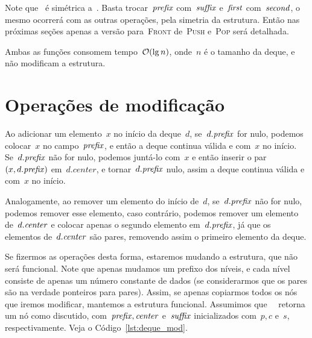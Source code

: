 \documentclass[main.tex]{subfiles}
\begin{document}
Note que~ é simétrica a~. Basta trocar~$\mathit{prefix}$ com~$\mathit{suffix}$ e~$\mathit{first}$ com~$\mathit{second}$, o mesmo ocorrerá com as outras operações, pela simetria da estrutura. Então nas próximas seções apenas a versão para~\textsc{Front} de~\textsc{Push} e~\textsc{Pop} será detalhada.

Ambas as funções consomem tempo~$\mathcal{O}(\lg n)$, onde~$n$ é o tamanho da deque, e não modificam a estrutura.

\section{Operações de modificação}

Ao adicionar um elemento~$x$ no início da deque~$d$, se~$d.\mathit{prefix}$ for nulo, podemos colocar~$x$ no campo~$\mathit{prefix}$, e então a deque continua válida e com~$x$ no início. Se~$d.\mathit{prefix}$ não for nulo, podemos juntá-lo com~$x$ e então inserir o par~$(x, d.\mathit{prefix})$ em~$d.center$, e tornar~$d.\mathit{prefix}$ nulo, assim a deque continua válida e com~$x$ no início.

Analogamente, ao remover um elemento do início de~$d$, se~$d.\mathit{prefix}$ não for nulo, podemos remover esse elemento, caso contrário, podemos remover um elemento de~$d.\mathit{center}$ e colocar apenas o segundo elemento em~$d.\mathit{prefix}$, já que os elementos de~$d.\mathit{center}$ são pares, removendo assim o primeiro elemento da deque.

Se fizermos as operações desta forma, estaremos mudando a estrutura, que não será funcional. Note que apenas mudamos um prefixo dos níveis, e cada nível consiste de apenas um número constante de dados (se considerarmos que os pares são na verdade ponteiros para pares).
Assim, se apenas copiarmos todos os nós que iremos modificar, mantemos a estrutura funcional. Assumimos que~\mbox{ } retorna um nó como discutido, com~$\mathit{prefix}, \mathit{center}$ e~$\mathit{suffix}$ inicializados com~$p, c$ e~$s$, respectivamente. Veja o Código~\ref{lst:deque_mod}.
\end{document}
